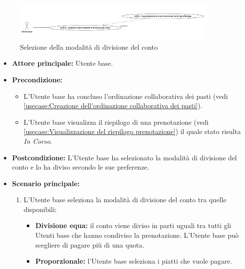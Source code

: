 \label{usecase:Selezione della modalità di divisione del conto}

\begin{figure}[h]
	\centering
	\includegraphics[width=0.9\textwidth]{./uml/UCB14.png} 
	\caption{Selezione della modalità di divisione del conto}
	\label{fig:UCB14}
  \end{figure}

\begin{itemize}
	\item \textbf{Attore principale:} Utente base.
	
	\item \textbf{Precondizione:}
	\begin{itemize}
		\item L'Utente base ha concluso l'ordinazione collaborativa dei pasti (vedi \autoref{usecase:Creazione dell'ordinazione collaborativa dei pasti}).
		\item L'Utente base visualizza il riepilogo di una prenotazione (vedi \autoref{usecase:Visualizzazione del riepilogo prenotazione}) il quale stato risulta \textit{In Corso}. 
	\end{itemize}

	\item \textbf{Postcondizione:}
	      L'Utente base ha selezionato la modalità di divisione del conto e lo ha diviso secondo le sue preferenze.
	\item \textbf{Scenario principale:}
	      \begin{enumerate}
		      \item L'Utente base seleziona la modalità di divisione del conto
		            tra quelle disponibili:
					\begin{itemize}
						\item \textbf{Divisione equa:} il conto viene diviso in parti
							  uguali tra tutti gli Utenti base che hanno condiviso la
							  prenotazione. L'Utente base può scegliere di pagare più di
							  una quota.
		  
						\item \textbf{Proporzionale:} l'Utente base seleziona i piatti che vuole
							  pagare.
					\end{itemize}


\end{enumerate}
\end{itemize}
